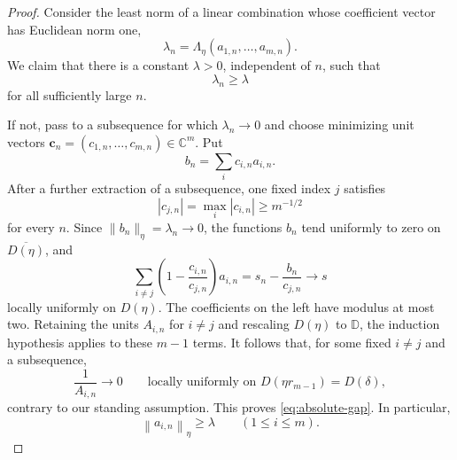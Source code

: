 \documentclass[12pt,letterpaper,reqno]{amsart}
\theoremstyle{definition}
\numberwithin{equation}{section}
\newcommand{\D}{\mathbb D}
\newcommand{\C}{\mathbb C}
\newcommand{\norm}[2]{\left\lVert #1\right\rVert_{#2}}
\begin{document}
\begin{proof}
		Consider the least norm of a linear combination whose coefficient
		vector has Euclidean norm one,
		\begin{equation*}
			\lambda_n=\Lambda_\eta(a_{1,n},\ldots,a_{m,n}).
		\end{equation*}
		We claim that there is a constant $\lambda>0$, independent of $n$, such
		that
		\begin{equation}\label{eq:absolute-gap}
			\lambda_n\ge\lambda
		\end{equation}
		for all sufficiently large $n$.
		
		If not, pass to a subsequence for which $\lambda_n\to0$ and choose
		minimizing unit vectors
		$\bm{c}_n=(c_{1,n},\ldots,c_{m,n})\in\C^m$. Put
		\begin{equation*}
			b_n=\sum_i c_{i,n}a_{i,n}.
		\end{equation*}
		After a further extraction of a subsequence, one fixed index $j$ satisfies
		\begin{equation*}
			|c_{j,n}|=\max_i|c_{i,n}|\ge m^{-1/2}
		\end{equation*}
		for every $n$. Since $\|b_n\|_\eta=\lambda_n\to0$, the functions $b_n$
		tend uniformly to zero on $\overline{D(\eta)}$, and
		\begin{equation*}
			\sum_{i\ne j}\left(1-\frac{c_{i,n}}{c_{j,n}}\right)a_{i,n}
			=s_n-\frac{b_n}{c_{j,n}}\longrightarrow s
		\end{equation*}
		locally uniformly on $D(\eta)$. The coefficients on the left have
		modulus at most two. Retaining the units $A_{i,n}$ for $i\ne j$ and
		rescaling $D(\eta)$ to $\D$, the induction hypothesis applies to these
		$m-1$ terms. It follows that, for some fixed $i\ne j$ and a
		subsequence,
		\begin{equation*}
			\frac1{A_{i,n}}\longrightarrow0
			\qquad\text{locally uniformly on }D(\eta r_{m-1})=D(\delta),
		\end{equation*}
		contrary to our standing assumption. This proves
		\eqref{eq:absolute-gap}. In particular,
		\begin{equation*}
			\norm{a_{i,n}}{\eta}\ge\lambda
			\qquad(1\le i\le m).
		\end{equation*}
		

\end{proof}
\end{document}
